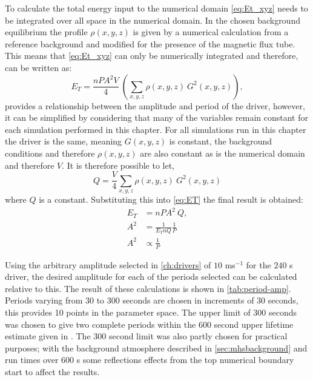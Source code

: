 \documentclass[a4paper,12pt,fourier,authoryear,custommargin]{Classes/PhDThesisPSnPDF}
\begin{document}
To calculate the total energy input to the numerical domain \cref{eq:Et_xyz} needs to be integrated over all space in the numerical domain.
In the chosen background equilibrium the profile $\rho(x,y,z)$ is given by a numerical calculation from a reference background and modified for the presence of the magnetic flux tube.
This means that \cref{eq:Et_xyz} can only be numerically integrated and therefore, can be written as:
\begin{equation}
    E_T = \frac{nPA^2V}{4}\ \left( \sum_{x,y,z} \rho(x,y,z)\ G^2(x,y,z) \right),\label{eq:ET}
\end{equation}
 provides a relationship between the amplitude and period of the driver, however, it can be simplified by considering that many of the variables remain constant for each simulation performed in this chapter.
For all simulations run in this chapter the driver is the same, meaning $G(x,y,z)$ is constant, the background conditions and therefore $\rho(x,y,z)$ are also constant as is the numerical domain and therefore $V$.
It is therefore possible to let,
\begin{equation}
    Q = \frac{V}{4} \sum_{x,y,z} \rho(x,y,z)\ G^2(x,y,z)
\end{equation}
where $Q$ is a constant.
Substituting this into \cref{eq:ET} the final result is obtained:
\begin{align}
    E_T &= nPA^2\ Q, \\
    A^2 &= \frac{1}{E_T n Q} \frac{1}{P} \\
    A^2 &\propto \frac{1}{P}
\end{align}

Using the arbitrary amplitude selected in \cref{ch:drivers} of $10$ ms$^{-1}$ for the $240$ s driver, the desired amplitude for each of the periods selected can be calculated relative to this.
The result of these calculations is shown in \cref{tab:period-amp}.
Periods varying from $30$ to $300$ seconds are chosen in increments of $30$ seconds, this provides 10 points in the parameter space.
The upper limit of $300$ seconds was chosen to give two complete periods within the $600$ second upper lifetime estimate given in \cite{sanchezalmeida2004}.
The $300$ second limit was also partly chosen for practical purposes; with the background atmosphere described in \cref{sec:mhsbackground} and run times over $600$ s some reflections effects from the top numerical boundary start to affect the results.
\end{document}
